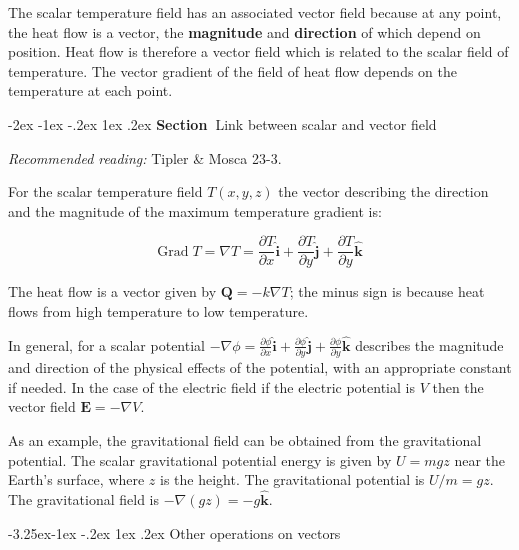 \documentclass[
]{book}
\makeatletter
\renewcommand\section{%
\@startsection{section}{1}{\z@}%
              {-2ex \@plus -1ex \@minus -.2ex}%
              {1ex \@plus .2ex}%
              {\sffamily\bfseries\large\noindent Section~}}
\renewcommand\subsection{%
\@startsection{subsection}{2}{\z@}%
              {-3.25ex\@plus -1ex \@minus -.2ex}%
              {1ex \@plus .2ex}%
              {\sffamily\bfseries}}
\makeatother
\begin{document}
The scalar temperature field has an associated vector field because at
any point, the heat flow is a vector, the \textbf{magnitude} and
\textbf{direction} of which depend on position. Heat flow is therefore a
vector field which is related to the scalar field of temperature. The
vector gradient of the field of heat flow depends on the temperature at
each point.

\hypertarget{link-between-scalar-and-vector-field}{%
\section{Link between scalar and vector field}\label{link-between-scalar-and-vector-field}}

\emph{Recommended reading:} Tipler \& Mosca 23-3.

For the scalar temperature field \(T(x,y,z)\) the vector describing the
direction and the magnitude of the maximum temperature gradient is:

\begin{equation}
\label{eq:tempGrad}
 \text{Grad} \; T = \nabla T = \frac{\partial T} {\partial x} \hat{\mathbf{i}} + \frac{\partial T}{\partial y} \hat{\mathbf{j}} + \frac{\partial T}{\partial y} \hat{\mathbf{k}}
\end{equation}

The heat flow is a vector given by \(\mathbf{Q} = -k \nabla T\); the minus sign is
because heat flows from high temperature to low temperature.

In general, for a scalar potential
\(-\nabla \phi = \frac{\partial \phi} {\partial x} \hat{\mathbf{i}} + \frac{\partial \phi}{\partial y} \hat{\mathbf{j}} + \frac{\partial \phi}{\partial y} \hat{\mathbf{k}}\)
describes the magnitude and direction of the physical effects of the
potential, with an appropriate constant if needed. In the case of the
electric field if the electric potential is \(V\) then the vector field
\(\mathbf{E} = -\nabla V\).

As an example, the gravitational field can be obtained from the
gravitational potential. The scalar gravitational potential energy is
given by \(U = mgz\) near the Earth's surface, where \(z\) is the height.
The gravitational potential is \(U/m = gz\). The gravitational field is
\(-\nabla(gz)=-g \hat{\mathbf{k}}\).

\hypertarget{other-operations-on-vectors}{%
\subsection{Other operations on vectors}\label{other-operations-on-vectors}}
\end{document}
